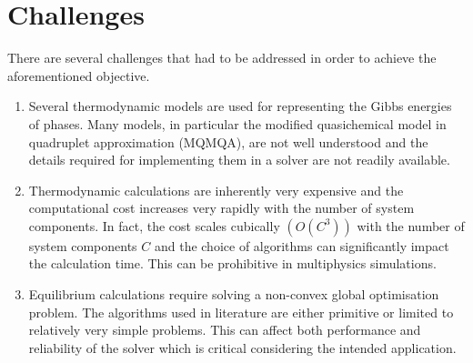 \section{Challenges}
    There are several challenges that had to be addressed in order to achieve the aforementioned objective.
    \begin{enumerate}
        \item Several thermodynamic models are used for representing the Gibbs energies of phases. Many models, in particular the modified quasichemical model in quadruplet approximation (MQMQA), are not well understood and the details required for implementing them in a solver are not readily available.
        \item Thermodynamic calculations are inherently very expensive and the computational cost increases very rapidly with the number of system components. In fact, the cost  scales cubically $\left(\mathit{O}\left(C^3\right)\right)$ with the number of system components $C$ and the choice of algorithms can significantly impact the calculation time. This can be prohibitive in multiphysics simulations.
        \item Equilibrium calculations require solving a non-convex global optimisation problem. The algorithms used in literature are either primitive or limited to relatively very simple problems. This can affect both performance and reliability of the solver which is critical considering the intended application.
        \end{enumerate}

